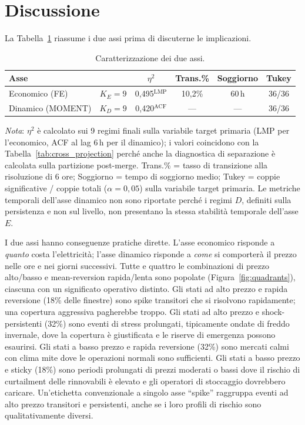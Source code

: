 \documentclass[12pt]{article}
\begin{document}
\section{Discussione}
\label{sec:discussion}

La Tabella~\ref{tab:comparison} riassume i due assi prima di discuterne le implicazioni.

\begin{table}[H]
\centering
\caption{Caratterizzazione dei due assi.}
\label{tab:comparison}
\small
\begin{tabular}{lccccc}
\toprule
Asse & & $\eta^2$ & Trans.\% & Soggiorno & Tukey \\
\midrule
Economico (FE)   & $K_E = 9$ & 0,495$^\text{LMP}$  & 10,2\%  & 60\,h & 36/36 \\
Dinamico (MOMENT) & $K_D = 9$ & 0,420$^\text{ACF}$  & ---  & ---  & 36/36 \\
\bottomrule
\end{tabular}

\medskip
\small
\textit{Nota}: $\eta^2$ è calcolato sui 9 regimi finali sulla variabile target primaria (LMP per l'economico, ACF al lag 6\,h per il dinamico); i valori coincidono con la Tabella~\ref{tab:cross_projection} perché anche la diagnostica di separazione è calcolata sulla partizione post-merge.
Trans.\% = tasso di transizione alla risoluzione di 6 ore; Soggiorno = tempo di soggiorno medio; Tukey = coppie significative / coppie totali ($\alpha = 0{,}05$) sulla variabile target primaria.
Le metriche temporali dell'asse dinamico non sono riportate perché i regimi $D$, definiti sulla persistenza e non sul livello, non presentano la stessa stabilità temporale dell'asse $E$.
\end{table}

I due assi hanno conseguenze pratiche dirette.
L'asse economico risponde a \emph{quanto} costa l'elettricità; l'asse dinamico risponde a \emph{come} si comporterà il prezzo nelle ore e nei giorni successivi.
Tutte e quattro le combinazioni di prezzo alto/basso e mean-reversion rapida/lenta sono popolate (Figura~\ref{fig:quadrants}), ciascuna con un significato operativo distinto.
Gli stati ad alto prezzo e rapida reversione (18\% delle finestre) sono spike transitori che si risolvono rapidamente; una copertura aggressiva pagherebbe troppo.
Gli stati ad alto prezzo e shock-persistenti (32\%) sono eventi di stress prolungati, tipicamente ondate di freddo invernale, dove la copertura è giustificata e le riserve di emergenza possono esaurirsi.
Gli stati a basso prezzo e rapida reversione (32\%) sono mercati calmi con clima mite dove le operazioni normali sono sufficienti.
Gli stati a basso prezzo e sticky (18\%) sono periodi prolungati di prezzi moderati o bassi dove il rischio di curtailment delle rinnovabili è elevato e gli operatori di stoccaggio dovrebbero caricare.
Un'etichetta convenzionale a singolo asse ``spike'' raggruppa eventi ad alto prezzo transitori e persistenti, anche se i loro profili di rischio sono qualitativamente diversi.
\end{document}
